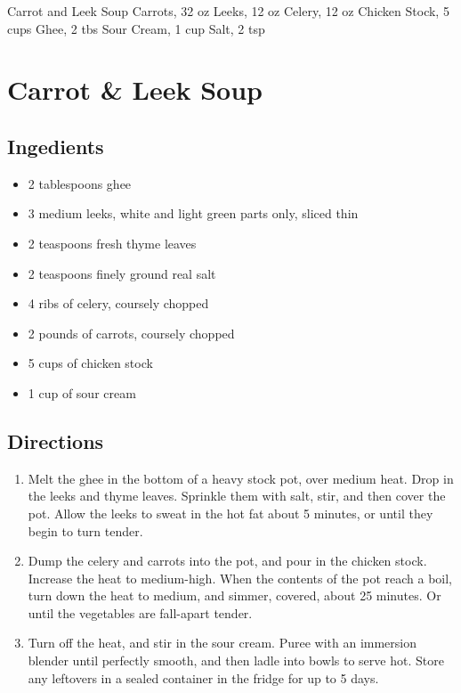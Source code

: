 Carrot and Leek Soup
  Carrots, 32 oz
  Leeks, 12 oz
  Celery, 12 oz
  Chicken Stock, 5 cups
  Ghee, 2 tbs
  Sour Cream, 1 cup
  Salt, 2 tsp

\section{ Carrot \& Leek Soup }

\subsection{ Ingedients }

\begin{itemize}
  \item 2 tablespoons ghee
  \item 3 medium leeks, white and light green parts only, sliced thin 
  \item 2 teaspoons fresh thyme leaves
  \item 2 teaspoons finely ground real salt
  \item 4 ribs of celery, coursely chopped
  \item 2 pounds of carrots, coursely chopped
  \item 5 cups of chicken stock
  \item 1 cup of sour cream
\end{itemize}

\subsection{ Directions }

\begin{enumerate}
  \item Melt the ghee in the bottom of a heavy stock pot, over medium heat. Drop in the leeks and thyme leaves. Sprinkle them with salt, stir, and then cover the pot. Allow the leeks to sweat in the hot fat about 5 minutes, or until they begin to turn tender.
  \item Dump the celery and carrots into the pot, and pour in the chicken stock. Increase the heat to medium-high. When the contents of the pot reach a boil, turn down the heat to medium, and simmer, covered, about 25 minutes. Or until the vegetables are fall-apart tender. 
  \item Turn off the heat, and stir in the sour cream. Puree with an immersion blender until perfectly smooth, and then ladle into bowls to serve hot. Store any leftovers in a sealed container in the fridge for up to 5 days. 
\end{enumerate}

